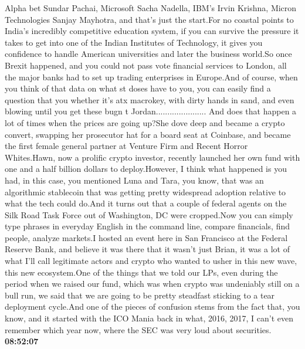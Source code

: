 \documentclass{article}%
\begin{document}
Alpha bet Sundar Pachai, Microsoft Sacha Nadella, IBM's Irvin Krishna, Micron Technologies Sanjay Mayhotra, and that's just the start.For no coastal points to India's incredibly competitive education system, if you can survive the pressure it takes to get into one of the Indian Institutes of Technology, it gives you confidence to handle American universities and later the business world.So once Brexit happened, and you could not pass vote financial services to London, all the major banks had to set up trading enterprises in Europe.And of course, when you think of that data on what st doses have to you, you can easily find a question that you  whether it's atx macrokey, with dirty hands in sand, and even blowing until you get these  bugn t Jordan......................  And does that happen a lot of times when the prices are going up?She dove deep and became a crypto convert, swapping her prosecutor hat for a board seat at Coinbase, and became the first female general partner at Venture Firm and Recent Horror Whites.Hawn, now a prolific crypto investor, recently launched her own fund with one and a half billion dollars to deploy.However, I think what happened is you had, in this case, you mentioned Luna and Tara, you know, that was an algorithmic stablecoin that was getting pretty widespread adoption relative to what the tech could do.And it turns out that a couple of federal agents on the Silk Road Task Force out of Washington, DC were cropped.Now you can simply type phrases in everyday English in the command line, compare financials, find people, analyze markets.I hosted an event here in San Francisco at the Federal Reserve Bank, and believe it was there that it wasn't just Brian, it was a lot of what I'll call legitimate actors and crypto who wanted to usher in this new wave, this new ecosystem.One of the things that we told our LPs, even during the period when we raised our fund, which was when crypto was undeniably still on a bull run, we said that we are going to be pretty steadfast sticking to a tear deployment cycle.And one of the pieces of confusion stems from the fact that, you know, and it started with the ICO Mania back in what, 2016, 2017, I can't even remember which year now, where the SEC was very loud about securities.%
\textbf{08:52:07}%
\newline%
\end{document}
